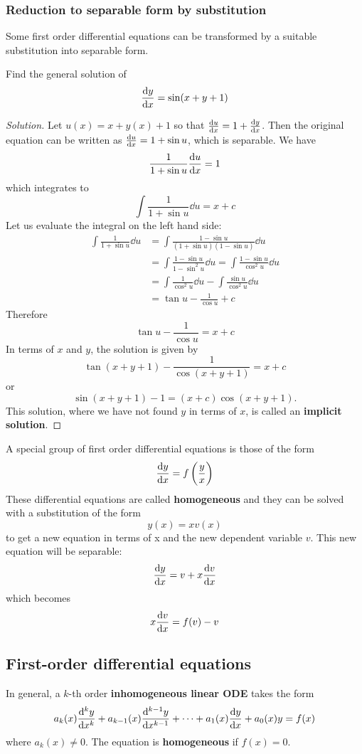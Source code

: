 \subsubsection{Reduction to separable form by substitution}
Some first order differential equations can be transformed by a suitable substitution into separable form.

\begin{exmp}{}{}
Find the general solution of
\[ \dv{y}{x} = \sin(x+y+1) \]
\end{exmp}

\begin{proof}[Solution]
Let $u(x) = x + y(x) + 1$ so that $\dv{u}{x} = 1 + \dv{y}{x}$. Then the original equation can be written as $\dv{u}{x} = 1 + \sin u$, which is separable. We have
\[ \frac{1}{1+\sin u}\dv{u}{x} = 1 \]
which integrates to
\[ \int \frac{1}{1+\sin u} \dd{u} = x+c \]
Let us evaluate the integral on the left hand side:
\begin{align*}
\int \frac{1}{1+\sin u} \dd{u}
&= \int \frac{1-\sin u}{(1+\sin u)(1-\sin u)} \dd{u} \\
&= \int \frac{1-\sin u}{1-\sin^2u} \dd{u} = \int \frac{1-\sin u}{\cos^2u} \dd{u} \\
&= \int \frac{1}{\cos^2u} \dd{u} - \int \frac{\sin u}{\cos^2u} \dd{u} \\
&= \tan u - \frac{1}{\cos u} + c
\end{align*}
Therefore 
\[ \tan u - \frac{1}{\cos u} = x+c \]
In terms of $x$ and $y$, the solution is given by
\[ \tan (x+y+1) - \frac{1}{\cos (x+y+1)} = x+c \]
or
\[ \sin (x+y+1) - 1 = (x+c) \cos (x+y+1). \]
This solution, where we have not found $y$ in terms of $x$, is called an \textbf{implicit solution}.
\end{proof}

A special group of first order differential equations is those of the form
\[ \dv{y}{x} = f\left(\frac{y}{x}\right) \]
These differential equations are called \textbf{homogeneous} and they can be solved with a substitution
of the form
\[ y(x) = xv(x) \]
to get a new equation in terms of x and the new dependent variable $v$. This new equation will be
separable:
\[ \dv{y}{x} = v + x\dv{v}{x} \]
which becomes
\[ x\dv{v}{x} = f(v) - v \]

\subsection{First-order differential equations}
In general, a $k$-th order \textbf{inhomogeneous linear ODE} takes the form
\[ a_k(x)\dv[k]{y}{x} + a_{k-1}(x)\dv[k-1]{y}{x} + \cdots + a_1(x)\dv{y}{x} + a_0(x)y = f(x) \]
where $a_k(x) \neq 0$. The equation is \textbf{homogeneous} if $f(x) = 0$. 

